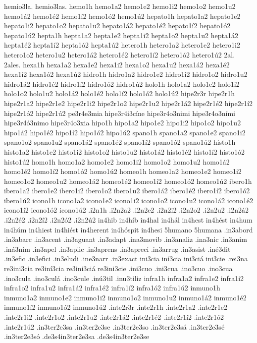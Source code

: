 {hemio3la.
hemio3las.
hemo1h
hemo1a2 hemo1e2 hemo1i2 hemo1o2 hemo1u2
hemo1á2 hemo1é2 hemo1í2 hemo1ó2 hemo1ú2
hepato1h
hepato1a2 hepato1e2 hepato1i2 hepato1o2 hepato1u2
hepato1á2 hepato1é2 hepato1í2 hepato1ó2 hepato1ú2
hepta1h
hepta1a2 hepta1e2 hepta1i2 hepta1o2 hepta1u2
hepta1á2 hepta1é2 hepta1í2 hepta1ó2 hepta1ú2
hetero1h
hetero1a2 hetero1e2 hetero1i2 hetero1o2 hetero1u2
hetero1á2 hetero1é2 hetero1í2 hetero1ó2 hetero1ú2
2al.
2ales.
hexa1h
hexa1a2 hexa1e2 hexa1i2 hexa1o2 hexa1u2
hexa1á2 hexa1é2 hexa1í2 hexa1ó2 hexa1ú2
hidro1h
hidro1a2 hidro1e2 hidro1i2 hidro1o2 hidro1u2
hidro1á2 hidro1é2 hidro1í2 hidro1ó2 hidro1ú2
holo1h
holo1a2 holo1e2 holo1i2 holo1o2 holo1u2
holo1á2 holo1é2 holo1í2 holo1ó2 holo1ú2
hipe2r3r
hipe2r1h
hipe2r1a2 hipe2r1e2 hipe2r1i2 hipe2r1o2 hipe2r1u2
hipe2r1á2 hipe2r1é2 hipe2r1í2 hipe2r1ó2 hipe2r1ú2
pe3r4e3mia
hipe3r4i3cíne
hipe3r4o3nimi
hipe3r4o3ními
hipe3r4ó3nimo
hipe3r4o3xia
hipo1h
hipo1a2 hipo1e2 hipo1i2 hipo1o2 hipo1u2
hipo1á2 hipo1é2 hipo1í2 hipo1ó2 hipo1ú2
spano1h
spano1a2 spano1e2 spano1i2 spano1o2 spano1u2
spano1á2 spano1é2 spano1í2 spano1ó2 spano1ú2
histo1h
histo1a2 histo1e2 histo1i2 histo1o2 histo1u2
histo1á2 histo1é2 histo1í2 histo1ó2 histo1ú2
homo1h
homo1a2 homo1e2 homo1i2 homo1o2 homo1u2
homo1á2 homo1é2 homo1í2 homo1ó2 homo1ú2
homeo1h
homeo1a2 homeo1e2 homeo1i2 homeo1o2 homeo1u2
homeo1á2 homeo1é2 homeo1í2 homeo1ó2 homeo1ú2
ibero1h
ibero1a2 ibero1e2 ibero1i2 ibero1o2 ibero1u2
ibero1á2 ibero1é2 ibero1í2 ibero1ó2 ibero1ú2
icono1h
icono1a2 icono1e2 icono1i2 icono1o2 icono1u2
icono1á2 icono1é2 icono1í2 icono1ó2 icono1ú2
.i2n1h
.i2n2a2 .i2n2e2 .i2n2i2 .i2n2o2 .i2n2u2
.i2n2á2 .i2n2é2 .i2n2í2 .i2n2ó2 .i2n2ú2
in4hib
in4híb
in4hal
in4hál
in4hest
in4hést
in4hum
in4húm
in4hiest
in4hiést
in4herent
in4hóspit
in4hesi
5humano
5humana
.in3abord
.in3abarc
.in3acent
.in3aguant
.in3adapt
.ina3movib
.in3analiz
.ina3nic
.in3anim
.iná3nim
.in3apel
.in3aplic
.in3aprens
.in3apreci
.in3arrug
.in3asist
.iné3dit
.in3efic
.in3efici
.in3eludi
.ine3narr
.in3exact
ini3cia
iní3cia
ini3ciá
ini3cie
.rei3na
re3ini3cia
re3iní3cia
re3ini3ciá
re3ini3cie
.ini3cuo
.ini3cua
.ino3cuo
.ino3cua
.ino3cula
.ino3culá
.ino3cule
.inú3til
.inu3tiliz
infra1h
infra1a2 infra1e2 infra1i2 infra1o2 infra1u2
infra1á2 infra1é2 infra1í2 infra1ó2 infra1ú2
inmuno1h
inmuno1a2 inmuno1e2 inmuno1i2 inmuno1o2 inmuno1u2
inmuno1á2 inmuno1é2 inmuno1í2 inmuno1ó2 inmuno1ú2
.inte2r3r
.inte2r1h
.inte2r1a2 .inte2r1e2 .inte2r1i2 .inte2r1o2 .inte2r1u2
.inte2r1á2 .inte2r1é2 .inte2r1í2 .inte2r1ó2 .inte2r1ú2
.in3ter2e3sa
.in3ter2e3se
.in3ter2e3so
.in3ter2e3sá
.in3ter2e3sé
.in3ter2e3só
.de3s4in3ter2e3sa
.de3s4in3ter2e3se
}
